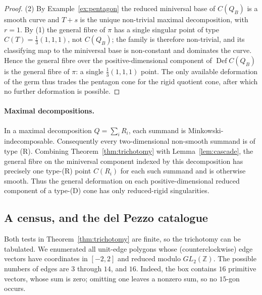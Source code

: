 \documentclass[11pt]{amsart}
\theoremstyle{definition}
\theoremstyle{remark}
\newcommand{\ZZ}{\mathbb{Z}}
\newcommand{\Def}{\operatorname{Def}}
\begin{document}
\begin{proof}
(2)  By Example~\ref{ex:pentagon} the reduced miniversal base of $C(Q_B)$
is a smooth curve and $T+s$ is the unique non-trivial maximal
decomposition, with $r=1$.  By (1) the general fibre of $\pi$ has a single
singular point of type $C(T) = \frac13(1,1,1)$, not $C(Q_B)$; the family is
therefore non-trivial, and its classifying map to the
miniversal base is non-constant and dominates the curve.  Hence the
general fibre over the positive-dimensional component of $\Def C(Q_B)$ is
the general fibre of $\pi$: a single $\frac13(1,1,1)$ point.  The only
available deformation of the germ thus trades the pentagon cone for the
rigid quotient cone, after which no further deformation is possible.
\end{proof}

\paragraph{Maximal decompositions.}
In a maximal decomposition $Q=\sum_i R_i$, each summand is
Minkowski-indecomposable.  Consequently every two-dimensional non-smooth
summand is of type \textup{(R)}.  Combining
Theorem~\ref{thm:trichotomy} with Lemma~\ref{lem:cascade}, the general fibre
on the miniversal component indexed by this decomposition has precisely one
type-\textup{(R)} point $C(R_i)$ for each such summand and is otherwise
smooth.  Thus the general deformation on each positive-dimensional reduced
component of a type-\textup{(D)} cone has only reduced-rigid singularities.

\subsection{A census, and the del Pezzo catalogue}\label{subsec:census}
Both tests in Theorem~\ref{thm:trichotomy} are finite, so the trichotomy can
be tabulated.  We enumerated all unit-edge polygons whose (counterclockwise)
edge vectors have coordinates in $[-2,2]$ and reduced modulo $GL_2(\ZZ)$.
The possible numbers of edges are $3$ through $14$, and $16$.
Indeed, the box contains $16$ primitive vectors, whose sum is zero;
omitting one leaves a nonzero sum, so no $15$-gon occurs.
\end{document}
